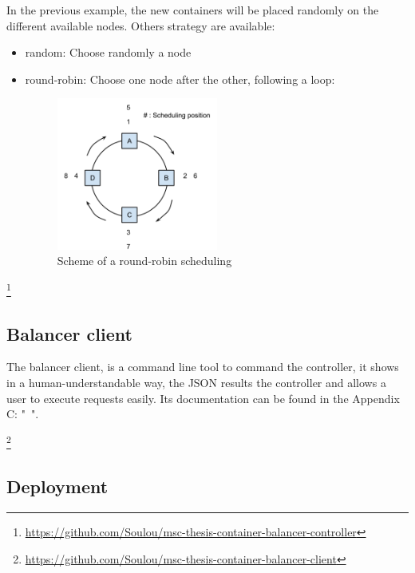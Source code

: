 In the previous example, the new containers will be placed randomly on the different
available nodes. Others strategy are available:

\begin{itemize}
\item{random: Choose randomly a node}
\item{round-robin: Choose one node after the other, following a loop:
\begin{figure}[h!]
\begin{center}
\includegraphics[width=0.5\textwidth]{./Images/round-robin.png}
\caption{Scheme of a round-robin scheduling}
\end{center}
\end{figure}}
\end{itemize}
 
\footnote{\url{https://github.com/Soulou/msc-thesis-container-balancer-controller}}

\subsection{Balancer client}

The balancer client, is a command line tool to command the controller, it
shows in a human-understandable way, the JSON results the controller and allows
a user to execute requests easily. Its documentation can be found in the
Appendix C: "~".

\footnote{\url{https://github.com/Soulou/msc-thesis-container-balancer-client}}

\subsection{Deployment}


